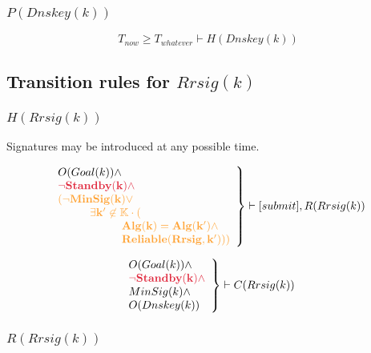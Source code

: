 \documentclass[twoside, a4paper]{article}
\newcommand{\highlightMinSig}[1]{\textcolor{MinSig}{\bf{#1}}}
\newcommand{\highlightStandby}[1]{\textcolor{Stdby}{\bf{#1}}}
\newcommand{\mathbox}[1]{#1}
\begin{document}
\subsubsection{$P(Dnskey(k))$}

\mathbox{

\highlightMinSig{
	\begin{equation}
			T_{now} \geq T_{whatever} \vdash H(Dnskey(k))
	\end{equation}
	}
}

\subsection{Transition rules for $Rrsig(k)$}

\subsubsection{$H(Rrsig(k))$}

\mathbox{
	Signatures may be introduced at any possible time.

	\begin{equation}
		\left.
		\begin{array}{l}
			O(Goal(k)) \wedge \\
\highlightStandby{			\neg Standby(k) \wedge }\\
\highlightMinSig{	(\neg MinSig(k) \vee }\\
\highlightMinSig{\hskip 1cm	\exists k' \not \in \mathbb{K}\cdot (}\\
\highlightMinSig{\hskip 2cm		Alg(k)=Alg(k') \wedge }\\
\highlightMinSig{\hskip 2cm		Reliable(Rrsig, k'))) }\\
		\end{array}
		\right\} \vdash [submit], R(Rrsig(k))
	\end{equation}

\highlightMinSig{
	\begin{equation}
		\left.
		\begin{array}{l}
			O(Goal(k)) \wedge \\
\highlightStandby{			\neg Standby(k) \wedge }\\
			MinSig(k) \wedge \\
			O(Dnskey(k)) \\
		\end{array}
		\right\} \vdash C(Rrsig(k))
	\end{equation}
	}
}

\subsubsection{$R(Rrsig(k))$}
\end{document}
